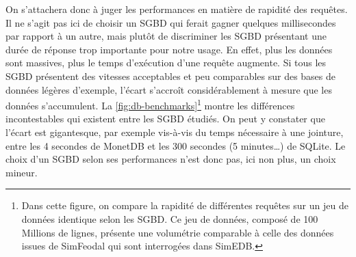			On s'attachera donc à juger les performances en matière de rapidité des requêtes.
			Il ne s'agit pas ici de choisir un SGBD qui ferait gagner quelques millisecondes par rapport à un autre, mais plutôt de discriminer les SGBD présentant une durée de réponse trop importante pour notre usage.
			En effet, plus les données sont massives, plus le temps d'exécution d'une requête augmente.
			Si tous les SGBD présentent des vitesses acceptables et peu comparables sur des bases de données légères d'exemple, l'écart s'accroît considérablement à mesure que les données s'accumulent.
			La \cref{fig:db-benchmarks}\footnote{
			Dans cette figure, on compare la rapidité de différentes requêtes sur un jeu de données identique selon les SGBD. Ce jeu de données, composé de 100 Millions de lignes, présente une volumétrie comparable à celle des données issues de SimFeodal qui sont interrogées dans SimEDB.
			} montre les différences incontestables qui existent entre les SGBD étudiés. On peut y constater que l'écart est gigantesque, par exemple vis-à-vis du temps nécessaire à une jointure, entre les 4 secondes de MonetDB et les 300 secondes (5 minutes\ldots) de SQLite.
			Le choix d'un SGBD selon ses performances n'est donc pas, ici non plus, un choix mineur.
			
